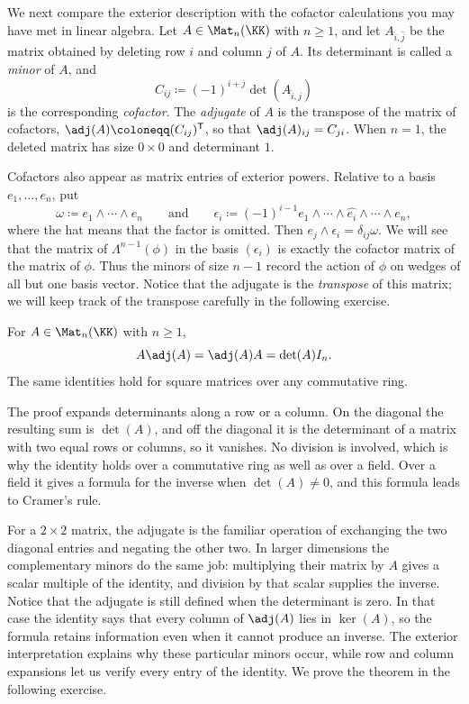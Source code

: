\documentclass[12pt,reqno]{amsart}
\begin{document}
\hrulefill

We next compare the exterior description with the cofactor calculations you may have met in linear algebra. Let $A\in\Mat_n(\KK)$ with $n\geq1$, and let $A_{\widehat i,\widehat j}$ be the matrix obtained by deleting row $i$ and column $j$ of $A$. Its determinant is called a \emph{minor} of $A$, and
\[
C_{ij}\coloneqq(-1)^{i+j}\det(A_{\widehat i,\widehat j})
\]
is the corresponding \emph{cofactor}. The \emph{adjugate} of $A$ is the transpose of the matrix of cofactors, $\adj(A)\coloneqq(C_{ij})^{\mathsf T}$, so that $\adj(A)_{ij}=C_{ji}$. When $n=1$, the deleted matrix has size $0\times0$ and determinant $1$.

Cofactors also appear as matrix entries of exterior powers. Relative to a basis $e_1,\ldots,e_n$, put
\[
\omega\coloneqq e_1\wedge\cdots\wedge e_n\qquad\text{and}\qquad\epsilon_i\coloneqq(-1)^{i-1}e_1\wedge\cdots\wedge\widehat{e_i}\wedge\cdots\wedge e_n,
\]
where the hat means that the factor is omitted. Then $e_j\wedge\epsilon_i=\delta_{ij}\omega$. We will see that the matrix of $\Lambda^{n-1}(\phi)$ in the basis $(\epsilon_i)$ is exactly the cofactor matrix of the matrix of $\phi$. Thus the minors of size $n-1$ record the action of $\phi$ on wedges of all but one basis vector. Notice that the adjugate is the \emph{transpose} of this matrix; we will keep track of the transpose carefully in the following exercise.

\begin{theorem}
For $A\in\Mat_n(\KK)$ with $n\geq1$,
\[
A\adj(A)=\adj(A)A=\det(A)I_n.
\]
The same identities hold for square matrices over any commutative ring.
\end{theorem}

The proof expands determinants along a row or a column. On the diagonal the resulting sum is $\det(A)$, and off the diagonal it is the determinant of a matrix with two equal rows or columns, so it vanishes. No division is involved, which is why the identity holds over a commutative ring as well as over a field. Over a field it gives a formula for the inverse when $\det(A)\ne0$, and this formula leads to Cramer's rule.

For a $2\times2$ matrix, the adjugate is the familiar operation of exchanging the two diagonal entries and negating the other two. In larger dimensions the complementary minors do the same job: multiplying their matrix by $A$ gives a scalar multiple of the identity, and division by that scalar supplies the inverse. Notice that the adjugate is still defined when the determinant is zero. In that case the identity says that every column of $\adj(A)$ lies in $\ker(A)$, so the formula retains information even when it cannot produce an inverse. The exterior interpretation explains why these particular minors occur, while row and column expansions let us verify every entry of the identity. We prove the theorem in the following exercise.
\end{document}
